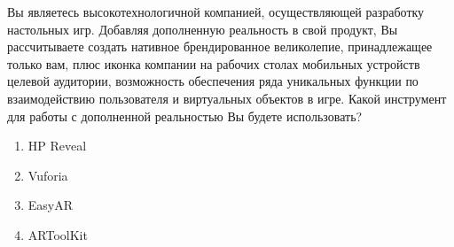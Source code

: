 
Вы являетесь высокотехнологичной компанией, осуществляющей разработку настольных игр. Добавляя дополненную реальность в свой продукт, Вы рассчитываете создать нативное брендированное великолепие, принадлежащее только вам, плюс иконка компании на рабочих столах мобильных устройств целевой аудитории, возможность обеспечения ряда уникальных функции по взаимодействию пользователя и виртуальных объектов в игре. Какой инструмент для работы с дополненной реальностью Вы будете использовать?

\begin{enumerate}
    \item HP Reveal
    \item Vuforia
    \item EasyAR
    \item ARToolKit
\end{enumerate}

